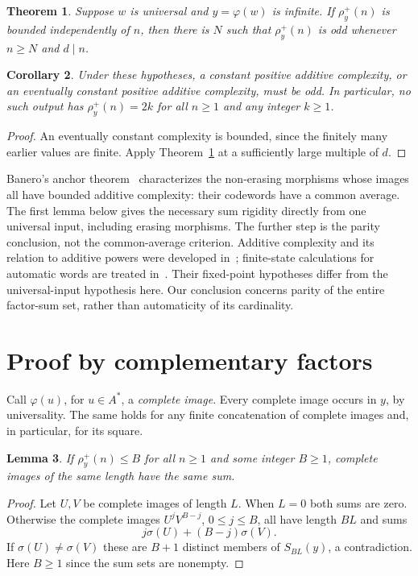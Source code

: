 \documentclass[11pt]{article}
\newtheorem{theorem}{Theorem}
\newtheorem{lemma}[theorem]{Lemma}
\newtheorem{corollary}[theorem]{Corollary}
\newcommand{\sumword}[1]{\sigma(#1)}
\begin{document}
\begin{theorem}\label{thm:parity}
Suppose $w$ is universal and $y=\varphi(w)$ is infinite.
If $\rho_y^+(n)$ is bounded independently of $n$, then there is $N$ such
that $\rho_y^+(n)$ is odd whenever $n\geq N$ and $d\mid n$.
\end{theorem}

\begin{corollary}\label{cor:constant}
Under these hypotheses, a constant positive additive complexity, or an
eventually constant positive additive complexity, must be odd.
In particular, no such output has $\rho_y^+(n)=2k$ for all $n\geq1$ and
any integer $k\geq1$.
\end{corollary}
\begin{proof}
An eventually constant complexity is bounded, since the finitely many
earlier values are finite. Apply Theorem~\ref{thm:parity} at a sufficiently
large multiple of $d$.
\end{proof}

Banero's anchor theorem~\cite[Theorem~21 and Lemma~22]{banero} characterizes the
non-erasing morphisms whose images all have bounded additive complexity:
their codewords have a common average. The first lemma below gives the
necessary sum rigidity directly from one universal input, including
erasing morphisms. The further step is the parity conclusion, not the
common-average criterion. Additive complexity and its relation to
additive powers were developed in~\cite{ardal}; finite-state calculations
for automatic words are treated in~\cite{popoli}.
Their fixed-point hypotheses differ from the universal-input hypothesis
here. Our conclusion concerns parity of the entire factor-sum set,
rather than automaticity of its cardinality.

\section{Proof by complementary factors}
Call $\varphi(u)$, for $u\in A^*$, a \emph{complete image}.
Every complete image occurs in $y$, by universality. The same holds for
any finite concatenation of complete images and, in particular, for its
square.

\begin{lemma}\label{lem:rigidity}
If $\rho_y^+(n)\leq B$ for all $n\geq1$ and some integer $B\geq1$, complete images of the same
length have the same sum.
\end{lemma}
\begin{proof}
Let $U,V$ be complete images of length $L$. When $L=0$ both sums are zero.
Otherwise the complete images $U^jV^{B-j}$, $0\leq j\leq B$, all have
length $BL$ and sums
\[
 j\sumword{U}+(B-j)\sumword{V}.
\]
If $\sumword{U}\neq\sumword{V}$ these are $B+1$ distinct members of
$S_{BL}(y)$, a contradiction. Here $B\geq1$ since the sum sets are nonempty.
\end{proof}
\end{document}
